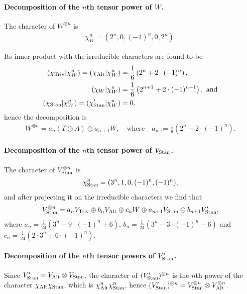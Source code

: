 {\begin{example}
	\paragraph{Decomposition of the $n$th tensor power of $W$.}	The character of $W^{\otimes n}$ is
	\begin{align*}
		\chi_{W}^n = (2^n, 0, (-1)^n, 0, 2^n).
	\end{align*}
	
	Its inner product with the irreducible characters are found to be
	\begin{align*}
		(\chi_{\text{Triv}}| \chi_{W}^n) = (\chi_{\text{Alt}} | \chi_{W}^n) &= \frac{1}{6} \left(2^n + 2 \cdot (-1)^n\right), \\
		(\chi_W | \chi_{W}^n) &= \frac{1}{6}\left(2^{n+1} + 2 \cdot (-1)^{n+1}\right), \text{ and}\\
		(\chi_{\text{Stan}} | \chi_{W}^n) = (\chi'_{\text{Stan}} | \chi_{W}^n) &= 0,
	\end{align*}
	hence the decomposition is
	\begin{align*}
		W^{\otimes n} = a_n (T \oplus A) \oplus a_{n+1} W, \quad \text{where} \quad a_n := \frac{1}{6}\left( 2^n + 2 \cdot (-1)^n \right).
	\end{align*}
	
	\paragraph{Decomposition of the $n$th tensor power of $V_{\text{Stan}}$.} The character of $V_{\text{Stan}}^{\otimes n}$ is 
	\begin{align*}
		\chi_{\text{Stan}}^n = (3^n, 1, 0, (-1)^n, (-1)^n),
	\end{align*}
	and after projecting it on the irreducible characters we find that
	\begin{align}\label{eq:nthpowerS}
		V_{\text{Stan}}^{\otimes n} = a_n V_{\text{Triv}} \oplus b_n V_{\text{Alt}} \oplus c_n W \oplus a_{n+1} V_{\text{Stan}} \oplus b_{n+1} V'_{\text{Stan}},
	\end{align}
	where $a_n = \frac{1}{24}(3^n + 9\cdot(-1)^n+6)$, $b_n = \frac{1}{24}(3^n - 3\cdot(-1)^n -6)$ and $c_n = \frac{1}{24}(2\cdot 3^n + 6\cdot(-1)^n)$.
	
	\paragraph{Decomposition of the $n$th tensor powers of $V'_{\text{Stan}}$.} Since $V'_{\text{Stan}} = V_{\text{Alt}} \otimes V_{\text{Stan}}$, the character of $(V'_{\text{Stan}})^{\otimes n}$ is the $n$th power of the character $\chi_{\text{Alt}} \chi_{\text{Stan}}$, which is $\chi_{\text{Alt}}^n\chi_{\text{Stan}}^n$, hence $(V'_{\text{Stan}})^{\otimes n} = V_{\text{Stan}}^{\otimes n} \otimes V_{\text{Alt}}^{\otimes n}$.
	

\end{example}}
